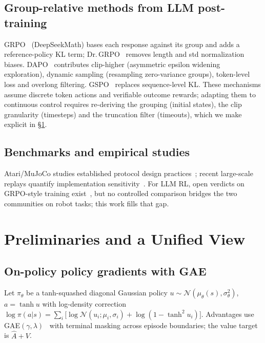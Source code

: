 \documentclass[journal,twoside]{IEEEtran}
\begin{document}
\subsection{Group-relative methods from LLM post-training}
GRPO~\cite{shao2024grpo} (DeepSeekMath) bases each response against its
group and adds a reference-policy KL term; Dr.\,GRPO~\cite{liu2025drgrpo}
removes length and std normalization biases. DAPO~\cite{yu2025dapo}
contributes clip-higher (asymmetric epsilon widening exploration),
dynamic sampling (resampling zero-variance groups), token-level loss and
overlong filtering. GSPO~\cite{qiu2025gspo} replaces sequence-level KL.
These mechanisms assume discrete token actions and verifiable outcome
rewards; adapting them to continuous control requires re-deriving the
grouping (initial states), the clip granularity (timesteps) and the
truncation filter (timeouts), which we make explicit in \S\ref{sec:methods}.

\subsection{Benchmarks and empirical studies}
Atari/MuJoCo studies established protocol design
practices~\cite{henderson2018deep,machado2018revisit}; recent
large-scale replays quantify implementation
sensitivity~\cite{engstrom2020implementation,huang2022closer}. For LLM RL,
open verdicts on GRPO-style training exist~\cite{yu2025dapo,liu2025drgrpo},
but no controlled comparison bridges the two communities on robot tasks;
this work fills that gap.

\section{Preliminaries and a Unified View}
\label{sec:methods}
\subsection{On-policy policy gradients with GAE}
Let $\pi_\theta$ be a tanh-squashed diagonal Gaussian policy
$u\!\sim\!\mathcal{N}(\mu_\theta(s),\sigma_\theta^2)$, $a=\tanh u$ with
log-density correction
$\log\pi(a|s)=\sum_i\!\big[\log\mathcal{N}(u_i;\mu_i,\sigma_i)
+\log(1\!-\!\tanh^2 u_i)\big]$.
Advantages use GAE$(\gamma,\lambda)$~\cite{schulman2016gae} with terminal
masking across episode boundaries; the value target is
$\hat A+V$.
\end{document}
